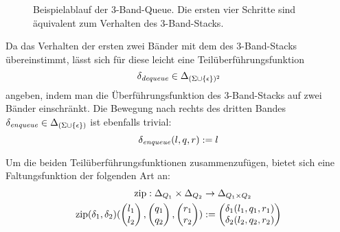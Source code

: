 \documentclass{article}
\DeclareMathOperator{\zip}{zip}
\begin{document}
\begin{figure}[h]
    \caption{Beispielablauf der 3-Band-Queue. Die ersten vier Schritte sind äquivalent zum Verhalten des 3-Band-Stacks.}
\end{figure}

Da das Verhalten der ersten zwei Bänder mit dem des 3-Band-Stacks übereinstimmt, lässt sich für diese leicht eine Teilüberführungsfunktion
\[ \delta_\mathit{dequeue} \in \Delta_{(\Sigma \cup \{\epsilon\})^2} \]
angeben, indem man die Überführungsfunktion des 3-Band-Stacks auf zwei Bänder einschränkt.  Die Bewegung nach rechts des dritten Bandes $\delta_\mathit{enqueue} \in \Delta_{(\Sigma \cup \{\epsilon\})}$ ist ebenfalls trivial:
\[ \delta_\mathit{enqueue}(l,q,r) := l \]

Um die beiden Teilüberführungsfunktionen zusammenzufügen, bietet sich eine Faltungsfunktion der folgenden Art an:
\begin{align*}
    \zip : \Delta_{Q_1} \times \Delta_{Q_2} &\rightarrow \Delta_{Q_1 \times Q_2} \\
    \zip(\delta_1, \delta_2)(\vet{l_1}{l_2},\vet{q_1}{q_2},\vet{r_1}{r_2}) &:= \vet{\delta_1(l_1,q_1,r_1)}{\delta_2(l_2,q_2,r_2)}
\end{align*}
\end{document}
